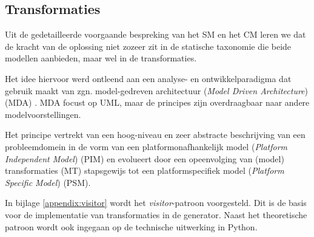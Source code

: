 
\subsection{Transformaties}
\label{subsection:devel-transformations}

Uit de gedetailleerde voorgaande bespreking van het SM en het CM leren we dat
de kracht van de oplossing niet zozeer zit in de statische taxonomie die beide
modellen aanbieden, maar wel in de transformaties.

Het idee hiervoor werd ontleend aan een analyse- en ontwikkelparadigma dat
gebruik maakt van zgn. model-gedreven architectuur (\emph{Model Driven
Architecture}) (MDA) \citep{soley2000model,kleppe2003mda}. MDA focust op UML,
maar de principes zijn overdraagbaar naar andere modelvoorstellingen.

Het principe vertrekt van een hoog-niveau en zeer abstracte beschrijving van
een probleemdomein in de vorm van een platformonafhankelijk model
(\emph{Platform Independent Model}) (PIM) en evolueert door een opeenvolging
van (model) transformaties (MT) stapsgewijs tot een platformspecifiek model
(\emph{Platform Specific Model}) (PSM).

In bijlage \ref{appendix:visitor} wordt het \emph{visitor}-patroon voorgesteld.
Dit is de basis voor de implementatie van transformaties in de generator. Naast
het theoretische patroon wordt ook ingegaan op de technische uitwerking in
Python.
